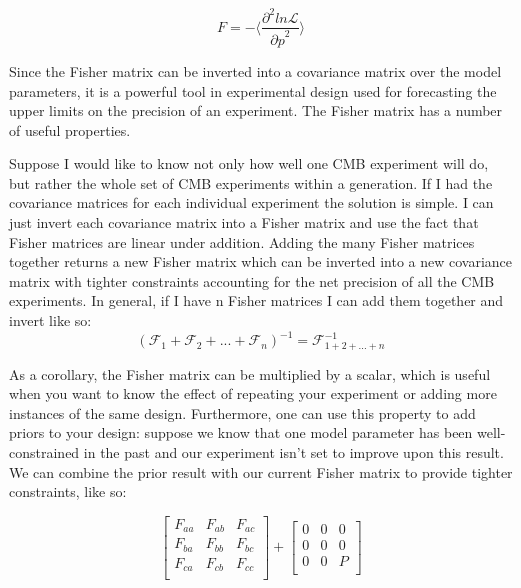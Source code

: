 \begin{equation}
\label{eqn:fisherinfo}
F = - \langle \frac{\partial^{2}ln{\mathcal{L}}}{{\partial p}^2} \rangle
\end{equation}

Since the Fisher matrix can be inverted into a covariance matrix over the model parameters, it is a powerful tool in experimental design used for forecasting the upper limits on the precision of an experiment. The Fisher matrix has a number of useful properties.

Suppose I would like to know not only how well one CMB experiment will do, but rather the whole set of CMB experiments within a generation. If I had the covariance matrices for each individual experiment the solution is simple. I can just invert each covariance matrix into a Fisher matrix and use the fact that Fisher matrices are linear under addition. Adding the many Fisher matrices together returns a new Fisher matrix which can be inverted into a new covariance matrix with tighter constraints accounting for the net precision of all the CMB experiments. In general, if I have n Fisher matrices I can add them together and invert like so:
\begin{equation}
(\mathcal{F}_{1} + \mathcal{F}_{2} + ... + \mathcal{F}_{n})^{-1} = \mathcal{F}^{-1}_{1+2+...+n}
\end{equation}

As a corollary, the Fisher matrix can be multiplied by a scalar, which is useful when you want to know the effect of repeating your experiment or adding more instances of the same design. Furthermore, one can use this property to add priors to your design: suppose we know that one model parameter has been well-constrained in the past and our experiment isn't set to improve upon this result. We can combine the prior result with our current Fisher matrix to provide tighter constraints, like so:

\begin{equation}
\label{eqn:prior}
\begin{bmatrix}
F_{aa} & F_{ab} & F_{ac}\\  
F_{ba} & F_{bb} & F_{bc}\\   
F_{ca} & F_{cb} & F_{cc}\\
\end{bmatrix}
+
\begin{bmatrix}
0 & 0 & 0  \\
0 & 0 & 0   \\
0 & 0 & P\\
\end{bmatrix}
\end{equation}

